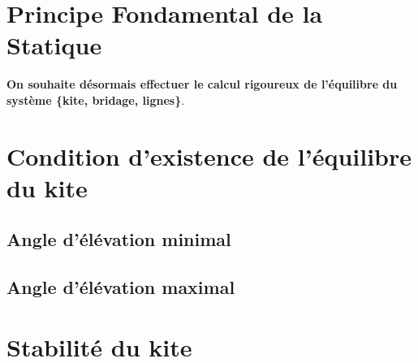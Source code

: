 \section{Principe Fondamental de la Statique} 
\label{sec:Ch2.2}

\textbf{On souhaite désormais effectuer le calcul rigoureux de l'équilibre du système \{kite, bridage, lignes\}}.




\section{\textbf{Condition d'existence de l'équilibre du kite}} 
\label{sec:Ch2.3}

\subsection{Angle d'élévation minimal} 
\label{sec:Ch2.3.1}

\subsection{Angle d'élévation maximal}
\label{sec:Ch2.3.2}


\section{\textbf{Stabilité du kite}} 
\label{sec:Ch2.4}